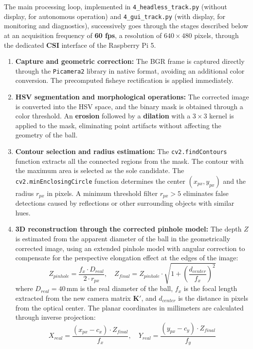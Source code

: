 \documentclass[12pt,a4paper]{report}
\begin{document}
The main processing loop, implemented in \texttt{4\_headless\_track.py} (without display, for autonomous operation) and \texttt{4\_gui\_track.py} (with display, for monitoring and diagnostics), successively goes through the stages described below at an acquisition frequency of \textbf{60 fps}, a resolution of $640 \times 480$ pixels, through the dedicated \textbf{CSI} interface of the Raspberry Pi 5.

\begin{enumerate}
    \item \textbf{Capture and geometric correction:} The BGR frame is captured directly through the \texttt{Picamera2} library \cite{picamera2} in native format, avoiding an additional color conversion. The precomputed fisheye rectification is applied immediately.

    \item \textbf{HSV segmentation and morphological operations:} The corrected image is converted into the HSV space, and the binary mask is obtained through a color threshold. An \textbf{erosion} followed by a \textbf{dilation} with a $3 \times 3$ kernel is applied to the mask, eliminating point artifacts without affecting the geometry of the ball.

    \item \textbf{Contour selection and radius estimation:} The \texttt{cv2.findContours} function extracts all the connected regions from the mask. The contour with the maximum area is selected as the sole candidate. The \texttt{cv2.minEnclosingCircle} function determines the center $(x_{px}, y_{px})$ and the radius $r_{px}$ in pixels. A minimum threshold filter $r_{px} > 5$ eliminates false detections caused by reflections or other surrounding objects with similar hues.

    \item \textbf{3D reconstruction through the corrected pinhole model:} The depth $Z$ is estimated from the apparent diameter of the ball in the geometrically corrected image, using an extended pinhole model with angular correction to compensate for the perspective elongation effect at the edges of the image:
    \begin{equation}
        Z_{pinhole} = \frac{f_x \cdot D_{real}}{2 \cdot r_{px}}, \quad
        Z_{final} = Z_{pinhole} \cdot \sqrt{1 + \left(\frac{d_{center}}{f_x}\right)^2}
    \end{equation}
    where $D_{real} = 40\,\text{mm}$ is the real diameter of the ball, $f_x$ is the focal length extracted from the new camera matrix $\mathbf{K'}$, and $d_{center}$ is the distance in pixels from the optical center. The planar coordinates in millimeters are calculated through inverse projection:
    \begin{equation}
        X_{real} = \frac{(x_{px} - c_x) \cdot Z_{final}}{f_x}, \quad Y_{real} = \frac{(y_{px} - c_y) \cdot Z_{final}}{f_y}
    \end{equation}


\end{enumerate}
\end{document}
